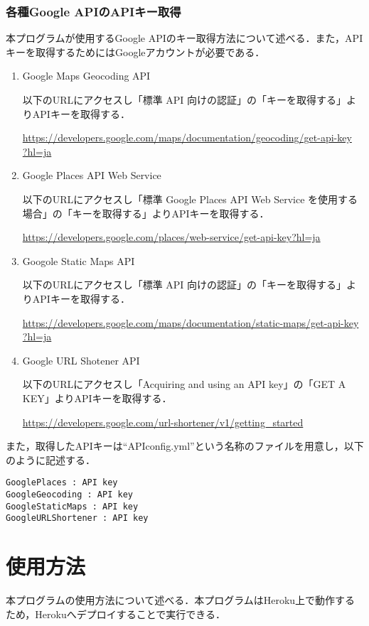 \documentclass[fleqn, 14pt]{extarticlej}
\begin{document}
\subsubsection{各種Google APIのAPIキー取得}
本プログラムが使用するGoogle APIのキー取得方法について述べる．また，APIキーを取得するためにはGoogleアカウントが必要である．

\begin{enumerate}
\item Google Maps Geocoding API
  
  以下のURLにアクセスし「標準 API 向けの認証」の「キーを取得する」よりAPIキーを取得する．
  
  \url{https://developers.google.com/maps/documentation/geocoding/get-api-key}\\
  \url{?hl=ja}
\item Google Places API Web Service
  
  以下のURLにアクセスし「標準 Google Places API Web Service を使用する場合」の「キーを取得する」よりAPIキーを取得する．
  
  \url{https://developers.google.com/places/web-service/get-api-key?hl=ja}
\item Googole Static Maps API
  
  以下のURLにアクセスし「標準 API 向けの認証」の「キーを取得する」よりAPIキーを取得する．
  
  \url{https://developers.google.com/maps/documentation/static-maps/get-api-key}\\
  \url{?hl=ja}
\item Google URL Shotener API
  
  以下のURLにアクセスし「Acquiring and using an API key」の「GET A KEY」よりAPIキーを取得する．
  
  \url{https://developers.google.com/url-shortener/v1/getting_started}
\end{enumerate}

また，取得したAPIキーは``APIconfig.yml''という名称のファイルを用意し，以下のように記述する．
\begin{verbatim}
GooglePlaces : API key
GoogleGeocoding : API key
GoogleStaticMaps : API key
GoogleURLShortener : API key
\end{verbatim}

\section{使用方法}
本プログラムの使用方法について述べる．本プログラムはHeroku上で動作するため，Herokuへデプロイすることで実行できる．
\end{document}
